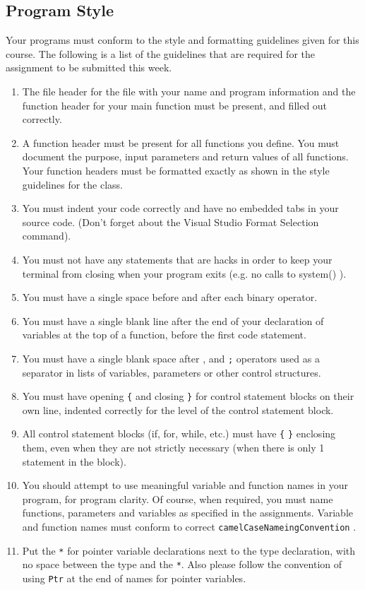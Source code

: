 \documentclass[11pt]{article}
\begin{document}
\subsection*{Program Style}
\label{sec-5-2}

Your programs must conform to the style and formatting guidelines
given for this course.  The following is a list of the guidelines that
are required for the assignment to be submitted this week.

\begin{enumerate}
\item The file header for the file with your name and program information
and the function header for your main function must be present, and
filled out correctly.
\item A function header must be present for all functions you define.
You must document the purpose, input parameters and return values
of all functions.  Your function headers must be formatted exactly
as shown in the style guidelines for the class.
\item You must indent your code correctly and have no embedded tabs in
your source code. (Don't forget about the Visual Studio Format
Selection command).
\item You must not have any statements that are hacks in order to keep
your terminal from closing when your program exits (e.g. no calls
to system() ).
\item You must have a single space before and after each binary operator.
\item You must have a single blank line after the end of your declaration
of variables at the top of a function, before the first code
statement.
\item You must have a single blank space after , and \verb~;~ operators used as a
separator in lists of variables, parameters or other control
structures.
\item You must have opening \verb~{~ and closing \verb~}~ for control statement blocks
on their own line, indented correctly for the level of the control
statement block.
\item All control statement blocks (if, for, while, etc.) must have \verb~{~
\verb~}~ enclosing them, even when they are not strictly necessary
(when there is only 1 statement in the block).
\item You should attempt to use meaningful variable and function names in
your program, for program clarity.  Of course, when required, you
must name functions, parameters and variables as specified in the
assignments.  Variable and function names must conform to correct
\verb~camelCaseNameingConvention~ .
\item Put the \verb~*~ for pointer variable declarations next to the
type declaration, with no space between the type and the \verb~*~.
Also please follow the convention of using \verb~Ptr~ at the end of
names for pointer variables.
\end{enumerate}
\end{document}
